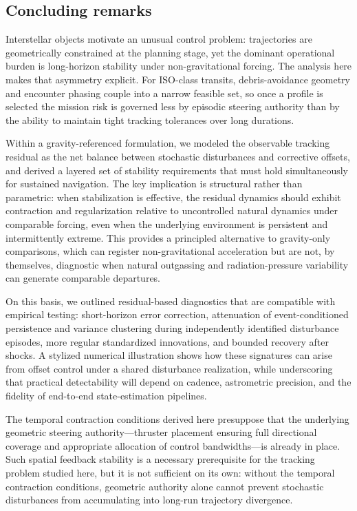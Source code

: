 \documentclass{article}
\begin{document}
\subsection{Concluding remarks}

Interstellar objects motivate an unusual control problem: trajectories are geometrically constrained at the planning stage, yet the dominant operational burden is long-horizon stability under non-gravitational forcing. The analysis here makes that asymmetry explicit. For ISO-class transits, debris-avoidance geometry and encounter phasing couple into a narrow feasible set, so once a profile is selected the mission risk is governed less by episodic steering authority than by the ability to maintain tight tracking tolerances over long durations.

Within a gravity-referenced formulation, we modeled the observable tracking residual as the net balance between stochastic disturbances and corrective offsets, and derived a layered set of stability requirements that must hold simultaneously for sustained navigation. The key implication is structural rather than parametric: when stabilization is effective, the residual dynamics should exhibit contraction and regularization relative to uncontrolled natural dynamics under comparable forcing, even when the underlying environment is persistent and intermittently extreme. This provides a principled alternative to gravity-only comparisons, which can register non-gravitational acceleration but are not, by themselves, diagnostic when natural outgassing and radiation-pressure variability can generate comparable departures.

On this basis, we outlined residual-based diagnostics that are compatible with empirical testing: short-horizon error correction, attenuation of event-conditioned persistence and variance clustering during independently identified disturbance episodes, more regular standardized innovations, and bounded recovery after shocks. A stylized numerical illustration shows how these signatures can arise from offset control under a shared disturbance realization, while underscoring that practical detectability will depend on cadence, astrometric precision, and the fidelity of end-to-end state-estimation pipelines.

The temporal contraction conditions derived here presuppose that the underlying geometric steering authority---thruster placement ensuring full directional coverage and appropriate allocation of control bandwidths---is already in place. Such spatial feedback stability is a necessary prerequisite for the tracking problem studied here, but it is not sufficient on its own: without the temporal contraction conditions, geometric authority alone cannot prevent stochastic disturbances from accumulating into long-run trajectory divergence.
\end{document}
